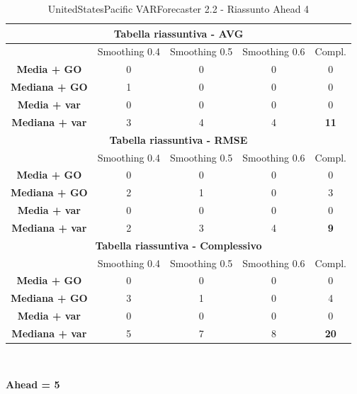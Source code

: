 \documentclass[12pt,a4paper,oneside,openright]{book}
\begin{document}
\begin{table}[H]
\centering
\begin{tabular}{|c|c|c|c|c|}
\hline
\multicolumn{5}{|c|}{\textbf{Tabella riassuntiva - AVG}} \\
\hline
& Smoothing 0.4 & Smoothing 0.5 & Smoothing 0.6 & Compl.\\
\hline
\textbf{Media + GO} & 0 & 0 & 0 & 0\\
\hline
\textbf{Mediana + GO} & 1 & 0 & 0 & 0\\ 
\hline
\textbf{Media + var} & 0 & 0 & 0 & 0\\
\hline
\textbf{Mediana + var} & 3 & 4 & 4 & \textbf{11}\\ 
\hline
\multicolumn{5}{|c|}{\textbf{Tabella riassuntiva - RMSE}} \\
\hline
& Smoothing 0.4 & Smoothing 0.5 & Smoothing 0.6 & Compl.\\
\hline
\textbf{Media + GO} & 0 & 0 & 0 & 0\\ 
\hline
\textbf{Mediana + GO} & 2 & 1 & 0 & 3\\ 
\hline
\textbf{Media + var} & 0 & 0 & 0 & 0\\ 
\hline
\textbf{Mediana + var} & 2 & 3 & 4 & \textbf{9}\\ 
\hline
\multicolumn{5}{|c|}{\textbf{Tabella riassuntiva - Complessivo}} \\
\hline
& Smoothing 0.4 & Smoothing 0.5 & Smoothing 0.6 & Compl.\\
\hline
\textbf{Media + GO} & 0 & 0 & 0 & 0\\
\hline
\textbf{Mediana + GO} & 3 & 1 & 0 & 4\\ 
\hline
\textbf{Media + var} & 0 & 0 & 0 & 0\\ 
\hline
\textbf{Mediana + var} & 5 & 7 & 8 & \textbf{20}\\ 
\hline
\end{tabular} \\ 
\caption{UnitedStatesPacific VARForecaster 2.2 - Riassunto Ahead 4}
\end{table}

\newpage

\textbf{Ahead = 5}

\medskip
\end{document}
